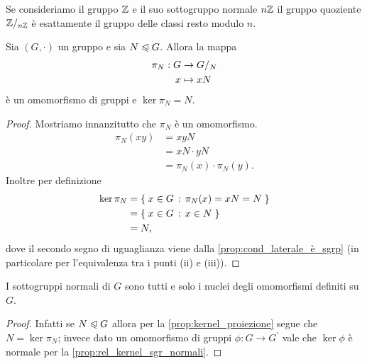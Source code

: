 \begin{example}
    Se consideriamo il gruppo $\mathbb{Z}$ e il suo sottogruppo normale $n\mathbb{Z}$ il gruppo quoziente $\mathbb{Z}/_{n\mathbb{Z}}$ è esattamente il gruppo delle classi resto modulo $n$.
\end{example}

\begin{proposition}\label{prop:kernel_proiezione}
    Sia $(G, \cdot)$ un gruppo e sia $N \trianglelefteqslant G$. Allora la mappa \begin{align}
        \begin{split}
            \pi_N : G &\to {G}/_{N}\\
            x &\mapsto xN
        \end{split}
    \end{align}
    è un omomorfismo di gruppi e $\ker \pi_N = N$.
\end{proposition}
\begin{proof}
    Mostriamo innanzitutto che $\pi_N$ è un omomorfismo. \begin{align*}
        \pi_N(xy) &= xyN \\
        &= xN \cdot yN\\
        &= \pi_N(x) \cdot \pi_N(y).
    \end{align*}
    Inoltre per definizione \begin{align*}
        \ker \pi_N &= \left\{\;x \in G \,:\, \pi_N(x) = xN = N\;\right\} \\
        &= \left\{\;x \in G \,:\, x \in N\;\right\}\\
        &= N,  
    \end{align*} dove il secondo segno di uguaglianza viene dalla \autoref{prop:cond_laterale_è_sgrp} (in particolare per l'equivalenza tra i punti (ii) e (iii)).
\end{proof}

\begin{corollary}
    I sottogruppi normali di $G$ sono tutti e solo i nuclei degli omomorfismi definiti su $G$.
\end{corollary}
\begin{proof}
    Infatti se $N \trianglelefteqslant G$ allora per la \autoref{prop:kernel_proiezione} segue che $N = \ker \pi_N$; invece dato un omomorfismo di gruppi $\phi : G \to G^\prime$ vale che $\ker \phi$ è normale per la \autoref{prop:rel_kernel_sgr_normali}.
\end{proof}